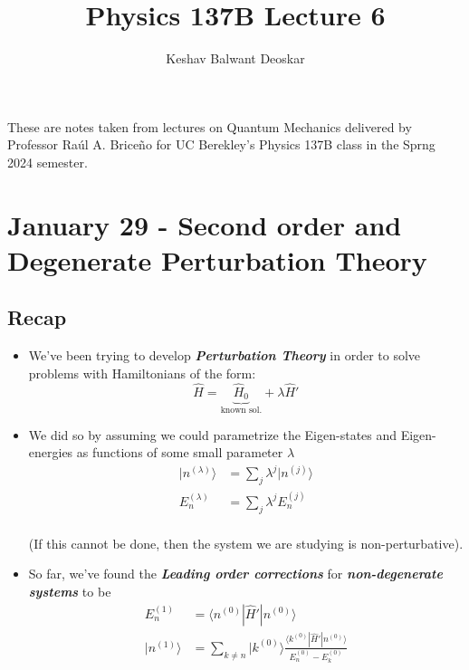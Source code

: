 \documentclass{article}
\title{Physics 137B Lecture 6}
\author{Keshav Balwant Deoskar}
\newcommand{\ket}[1]{|#1 \rangle}
\newcommand{\inner}[2]{\langle #1 | #2 \rangle}
\begin{document}
\maketitle

These are notes taken from lectures on Quantum Mechanics delivered by Professor Raúl A. Briceño for UC Berekley's Physics 137B class in the Sprng 2024 semester.

\tableofcontents

\pagebreak

\section{January 29 - Second order and Degenerate Perturbation Theory}

\vskip 1cm
\subsection*{Recap}
\begin{itemize}
  \item We've been trying to develop \textbf{\emph{Perturbation Theory}} in order to solve problems with Hamiltonians of the form:
  \[ \hat{H} = \underbrace{\hat{H}_0}_{\text{known sol.}} + \lambda\hat{H}' \]

  \item We did so by assuming we could parametrize the Eigen-states and Eigen-energies as functions of some small parameter $\lambda$
  \begin{align*}
    \ket{n^{(\lambda)}} &= \sum_{j} \lambda^j \ket{n^{(j)}} \\
    E_n^{(\lambda)} &= \sum_{j} \lambda^j E_n^{(j)} \\
  \end{align*} 

  (If this cannot be done, then the system we are studying is non-perturbative).

  \item So far, we've found the \textbf{\emph{Leading order corrections}} for \emph{\textbf{non-degenerate systems}} to be
  \begin{align*}
    E_n^{(1)} &= \inner{n^{(0)}}{\hat{H}'|n^{(0)}} \\
    \ket{n^{(1)}} &= \sum_{k \neq n} \ket{k^{(0)}} \frac{\inner{k^{(0)}}{\hat{H}'|n^{(0)}}}{E_n^{(0)} - E_k^{(0)}}
  \end{align*}
\end{itemize}

\vskip 1cm
\end{document}

